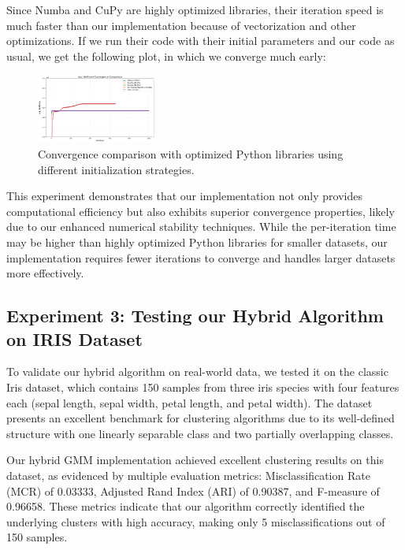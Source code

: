 \documentclass[conference]{IEEEtran}
\begin{document}
Since Numba and CuPy are highly optimized libraries, their iteration speed is much faster than our implementation because of vectorization and other optimizations. If we run their code with their initial parameters and our code as usual, we get the following plot, in which we converge much early:

\begin{figure}[h!]
    \centering
    \includegraphics[width=0.35\textwidth]{azizi3.png}
    \caption{Convergence comparison with optimized Python libraries using different initialization strategies.}
\end{figure}

This experiment demonstrates that our implementation not only provides computational efficiency but also exhibits superior convergence properties, likely due to our enhanced numerical stability techniques. While the per-iteration time may be higher than highly optimized Python libraries for smaller datasets, our implementation requires fewer iterations to converge and handles larger datasets more effectively.

\subsection{Experiment 3: Testing our Hybrid Algorithm on IRIS Dataset}

To validate our hybrid algorithm on real-world data, we tested it on the classic Iris dataset, which contains 150 samples from three iris species with four features each (sepal length, sepal width, petal length, and petal width). The dataset presents an excellent benchmark for clustering algorithms due to its well-defined structure with one linearly separable class and two partially overlapping classes.

Our hybrid GMM implementation achieved excellent clustering results on this dataset, as evidenced by multiple evaluation metrics: Misclassification Rate (MCR) of 0.03333, Adjusted Rand Index (ARI) of 0.90387, and F-measure of 0.96658. These metrics indicate that our algorithm correctly identified the underlying clusters with high accuracy, making only 5 misclassifications out of 150 samples.
\end{document}
